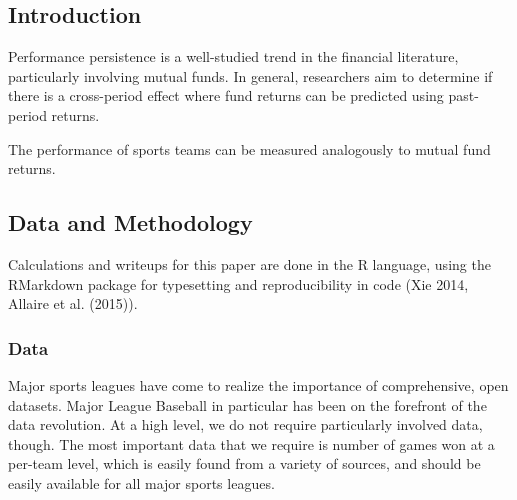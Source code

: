                                                                                                                                                                                       
                                                                                                                                                                                      
                                                                                                                                                                                      
                                                                                                                                                                                                      \vskip 6.5pt

                                                                                                                                                                                                      \noindent  \subsection{Introduction}\label{introduction}

Performance persistence is a well-studied trend in the financial
literature, particularly involving mutual funds. In general, researchers
aim to determine if there is a cross-period effect where fund returns
can be predicted using past-period returns.

The performance of sports teams can be measured analogously to mutual
fund returns.

\subsection{Data and Methodology}\label{data-and-methodology}

Calculations and writeups for this paper are done in the R language,
using the RMarkdown package for typesetting and reproducibility in code
(Xie 2014, Allaire et al. (2015)).

\subsubsection{Data}\label{data}

Major sports leagues have come to realize the importance of
comprehensive, open datasets. Major League Baseball in particular has
been on the forefront of the data revolution. At a high level, we do not
require particularly involved data, though. The most important data that
we require is number of games won at a per-team level, which is easily
found from a variety of sources, and should be easily available for all
major sports leagues.

